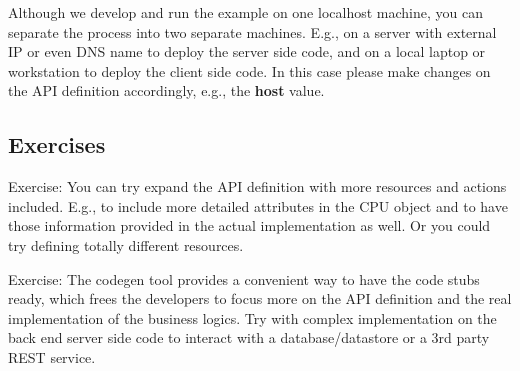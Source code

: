 Although we develop and run the example on one localhost machine, you
can separate the process into two separate machines. E.g., on a server
with external IP or even DNS name to deploy the server side code, and on
a local laptop or workstation to deploy the client side code. In this
case please make changes on the API definition accordingly, e.g., the
\textbf{host} value.

\hypertarget{exercises}{%
\subsection{Exercises}\label{exercises}}

Exercise: You can try expand the API definition with more resources and
actions included. E.g., to include more detailed attributes in the CPU
object and to have those information provided in the actual
implementation as well. Or you could try defining totally different
resources.

Exercise: The codegen tool provides a convenient way to have the code
stubs ready, which frees the developers to focus more on the API
definition and the real implementation of the business logics. Try with
complex implementation on the back end server side code to interact with
a database/datastore or a 3rd party REST service.
